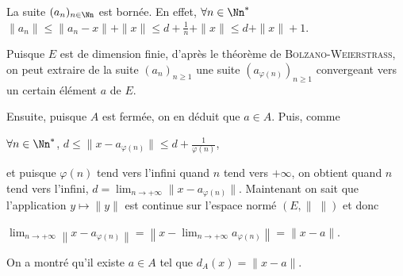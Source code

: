 {\begin{enumerate}
{La suite $(a_n)_{n\in\Nn}$ est bornée. En effet, $\forall n\in\Nn^*$ $\|a_n\|\leqslant \|a_n-x\|+\|x\|\leqslant d+ \frac{1}{n}+\| x\|\leqslant d+\|x\|+1$.

Puisque $E$ est de dimension finie, d'après le théorème de \textsc{Bolzano}-\textsc{Weierstrass},  on peut extraire de la suite $(a_n)_{n\geqslant1}$ une suite $(a_{\varphi(n)})_{n\geqslant1}$ convergeant vers un certain élément $a$ de $E$.

Ensuite, puisque $A$ est fermée, on en déduit que $a\in A$. Puis, comme

\begin{center}
$\forall n\in\Nn^*$, $d\leqslant\|x-a_{\varphi(n)}\| \leqslant d+ \frac{1}{\varphi(n)}$,
\end{center}

et puisque $\varphi(n)$ tend vers l'infini quand $n$ tend vers $+\infty$, on obtient quand $n$ tend vers l'infini, $d =\lim_{n \rightarrow +\infty}\|x-a_{\varphi(n)}\|$. Maintenant on sait que l'application $y\mapsto\|y\|$ est continue sur l'espace normé $(E,\|\;\|)$ et donc 

\begin{center}
$\lim_{n \rightarrow +\infty}\left\|x-a_{\varphi(n)}\right\|=\left\|x-\lim_{n \rightarrow +\infty}a_{\varphi(n)}\right\|=\|x-a\|$.
\end{center}

On a montré qu'il existe $a\in A$ tel que $d_A(x)=\|x-a\|$.}
\end{enumerate}
}